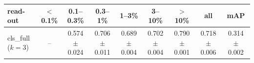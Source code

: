 \begin{tabular}{lcccccccc}
\toprule
read-out & $<$0.1\% & 0.1--0.3\% & 0.3--1\% & 1--3\% & 3--10\% & $>$10\% & all & mAP \\
\midrule
cls\_full ($k=3$) & -- & 0.574 $\pm$ 0.024 & 0.706 $\pm$ 0.011 & 0.689 $\pm$ 0.004 & 0.702 $\pm$ 0.004 & 0.790 $\pm$ 0.001 & 0.718 $\pm$ 0.006 & 0.314 $\pm$ 0.002 \\
\bottomrule
\end{tabular}
